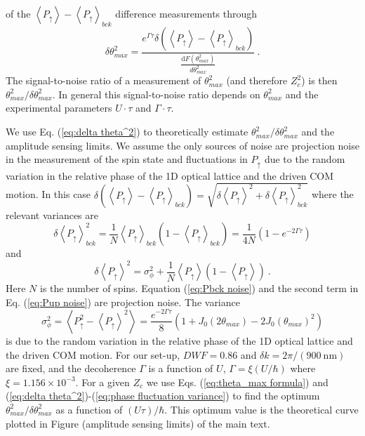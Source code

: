 \documentclass[aps,prl,superscriptaddress,floatfix]{revtex4-1}
\begin{document}
of the $\left\langle P_{\uparrow}\right\rangle -\left\langle P_{\uparrow}\right\rangle _{bck}$
difference measurements through
\begin{equation}
\delta\theta_{max}^{2}=\frac{e^{\Gamma\tau}\delta\left(\left\langle P_{\uparrow}\right\rangle -\left\langle P_{\uparrow}\right\rangle _{bck}\right)}{\frac{\mathrm{d}F\left(\theta_{max}^{2}\right)}{d\theta_{max}^{2}}}\:.\label{eq:delta theta^2}
\end{equation}
The signal-to-noise ratio of a measurement of $\theta_{max}^{2}$
(and therefore $Z_{c}^{2}$) is then $\theta_{max}^{2}/\delta\theta_{max}^{2}$.
In general this signal-to-noise ratio depends on $\theta_{max}^{2}$
and the experimental parameters $U\cdot\tau$ and $\Gamma\cdot\tau$$ $.

We use Eq. (\ref{eq:delta theta^2}) to theoretically estimate $\theta_{max}^{2}/\delta\theta_{max}^{2}$
and the amplitude sensing limits. We assume the only sources of noise
are projection noise in the measurement of the spin state and fluctuations
in $P_{\uparrow}$ due to the random variation in the relative phase
of the 1D optical lattice and the driven COM motion. In this case
$\delta\left(\left\langle P_{\uparrow}\right\rangle -\left\langle P_{\uparrow}\right\rangle _{bck}\right)=\sqrt{\delta\left\langle P_{\uparrow}\right\rangle ^{2}+\delta\left\langle P_{\uparrow}\right\rangle _{bck}^{2}}$
where the relevant variances are
\begin{equation}
\delta\left\langle P_{\uparrow}\right\rangle _{bck}^{2}=\frac{1}{N}\left\langle P_{\uparrow}\right\rangle _{bck}\left(1-\left\langle P_{\uparrow}\right\rangle _{bck}\right)=\frac{1}{4N}\left(1-e^{-2\Gamma\tau}\right)\label{eq:Pbck noise}
\end{equation}
and
\begin{equation}
\delta\left\langle P_{\uparrow}\right\rangle ^{2}=\sigma_{\phi}^{2}+\frac{1}{N}\left\langle P_{\uparrow}\right\rangle \left(1-\left\langle P_{\uparrow}\right\rangle \right)\:.\label{eq:Pup noise}
\end{equation}
Here $N$ is the number of spins. Equation (\ref{eq:Pbck noise})
and the second term in Eq. (\ref{eq:Pup noise}) are projection noise.
The variance 
\begin{equation}
\sigma_{\phi}^{2}=\left\langle P_{\uparrow}^{2}-\left\langle P_{\uparrow}\right\rangle ^{2}\right\rangle =\frac{e^{-2\Gamma\tau}}{8}\left(1+J_{0}\left(2\theta_{max}\right)-2J_{0}\left(\theta_{max}\right)^{2}\right)\label{eq:phase fluctuation variance}
\end{equation}
is due to the random variation in the relative phase of the 1D optical
lattice and the driven COM motion. For our set-up, $DWF=0.86$ and
$\delta k=2\pi/\left(900\:\mathrm{nm}\right)$ are fixed, and the
decoherence $\Gamma$ is a function of $U$, $\Gamma=\xi\left(U/\hbar\right)$
where $\xi=1.156\times10^{-3}$. For a given $Z_{c}$ we use Eqs.
(\ref{eq:theta_max formula}) and (\ref{eq:delta theta^2})-(\ref{eq:phase fluctuation variance})
to find the optimum $\theta_{max}^{2}/\delta\theta_{max}^{2}$ as
a function of $\left(U\tau\right)/\hbar$. This optimum value is the
theoretical curve plotted in Figure (amplitude sensing limits) of
the main text.
\end{document}

